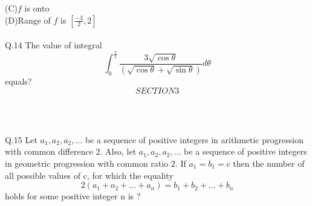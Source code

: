 \documentclass[11pt]{article}
\begin{document}
(C)$f$ is onto\\
(D)Range of $f$ is $[\frac{-3}{2},2]$\\
\\
Q.14 The value of integral 
$$
\int_{0}^{\frac{\pi}{2}} \frac{3\sqrt{\cos\theta}}{(\sqrt{\cos\theta}+\sqrt{\sin \theta})} d\theta
$$
equals?\\
\newpage
                     $$SECTION3$$\\
\begin{center}
 \\
\end{center}
Q.15 Let $a_1,a_2,a_2,\dots $ be a sequence of positive integers in arithmetic progression with common difference 2. Also, let $a_1,a_2,a_2,\dots $ be a sequence of positive integers in geometric progression with common ratio 2. If $a_1=b_1=c$ then the number of all possible values of c, for which the equality$$2(a_1+a_2+\dots +a_n)=b_1+b_2+\dots +b_n$$
holds for some positive integer n is ?                    
\end{document}
